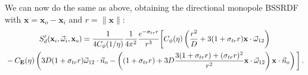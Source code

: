 \documentclass[10pt,a4paper]{article}
\begin{document}
We can now do the same as above, obtaining the directional monopole BSSRDF with $\mathbf{x} = \mathbf{x}_o - \mathbf{x}_i$ and $r = \|\mathbf{x}\|$:
\begin{multline*}
S_d'(\mathbf{x}_i, \vec{\omega}_i, \mathbf{x}_o)  = \frac{1}{4C_{\phi}(1/\eta)} \frac{1}{4 \pi^2} \frac{e^{-\sigma_{tr} r}}{r^3} \bigg[ C_{\phi}(\eta) \left(\frac{r^2}{D} +  3 (1 + \sigma_{tr} r) \mathbf{x}\cdot\vec{\omega}_{12} \right) \\ {}-C_{\mathbf{E}}(\eta) \left(3D (1 + \sigma_{tr} r) \vec{\omega}_{12} \cdot \vec{n}_o - \left((1 + \sigma_{tr} r) + 3D \frac{3 (1 + \sigma_{tr} r)  + (\sigma_{tr} r)^2}{r^2}\mathbf{x}\cdot\vec{\omega}_{12}\right) \mathbf{x} \cdot \vec{n}_o\right) \bigg] \, .
\end{multline*}




\end{document}
